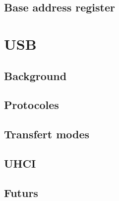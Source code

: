 \subsection{Base address register}

\section{USB}
\subsection*{Background}
\subsection{Protocoles}
\subsection{Transfert modes}
\subsection{UHCI}
\subsection{Futurs}


